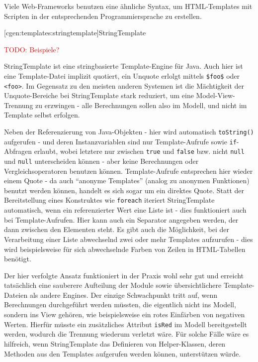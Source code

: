 \documentclass[a4paper, bibgerm]{book}
\newcommand\icode[1]{\lstinline?#1?}
\newcommand{\todo}[1]{
  \textcolor{red}{TODO: #1}
}
\newcommand\lsubsection{}
\begin{document}
Viele Web-Frameworks benutzen eine ähnliche Syntax, um HTML-Templates
mit Scripten in der entsprechenden Programmiersprache zu erstellen.

\lsubsection[cgen:templates:stringtemplate]{StringTemplate}

\todo{Beispiele?}

StringTemplate\cite{StringTemplate} ist eine stringbasierte
Template-Engine für Java. Auch hier ist eine Template-Datei implizit
quotiert, ein Unquote erlolgt mittels \icode{$foo$} oder
\icode{<foo>}. Im Gegensatz zu den meisten anderen Systemen ist die
Mächtigkeit der Unquote-Bereiche bei StringTemplate stark reduziert, um
eine Model-View-Trennung zu erzwingen - alle Berechnungen sollen also im
Modell, und nicht im Template selbst erfolgen.

Neben der Referenzierung von Java-Objekten - hier wird automatisch
\icode{toString()} aufgerufen - und deren Instanzvariablen sind nur
Template-Aufrufe sowie \icode{if}-Abfragen erlaubt, wobei letztere nur
zwischen \icode{true} und \icode{false} bzw. nicht \icode{null} und
\icode{null} unterscheiden können - aber keine Berechnungen oder
Vergleichsoperatoren benutzen können. Template-Aufrufe entsprechen hier
wieder einem Quote - da auch "`anonyme Templates"' (analog zu anonymen
Funktionen) benutzt werden können, handelt es sich sogar um ein direktes
Quote. Statt der Bereitstellung eines Konstruktes wie \icode{foreach}
iteriert StringTemplate automatisch, wenn ein referenzierter Wert eine
Liste ist - dies funktioniert auch bei Template-Aufrufen. Hier kann auch
ein Separator angegeben werden, der dann zwischen den Elementen
steht. Es gibt auch die Möglichkeit, bei der Verarbeitung einer Liste
abwechselnd zwei oder mehr Templates aufzurufen - dies wird
beispielsweise für sich abwechselnde Farben von Zeilen in HTML-Tabellen
benötigt.

Der hier verfolgte Ansatz funktioniert in der Praxis wohl sehr gut und
erreicht tatsächlich eine sauberere Aufteilung der Module sowie
übersichtlichere Template-Dateien als andere Engines. Der einzige
Schwachpunkt tritt auf, wenn Berechnungen durchgeführt werden müssten,
die eigentlich nicht ins Modell, sondern ins View gehören, wie
beispielsweise ein rotes Einfärben von negativen Werten. Hierfür müsste
ein zusätzliches Attribut \icode{isRed} im Modell bereitgestellt werden,
wodurch die Trennung wiederum verletzt wäre. Für solche Fälle wäre es
hilfreich, wenn StringTemplate das Definieren von Helper-Klassen, deren
Methoden aus den Templates aufgerufen werden können, unterstützen würde.
\end{document}
